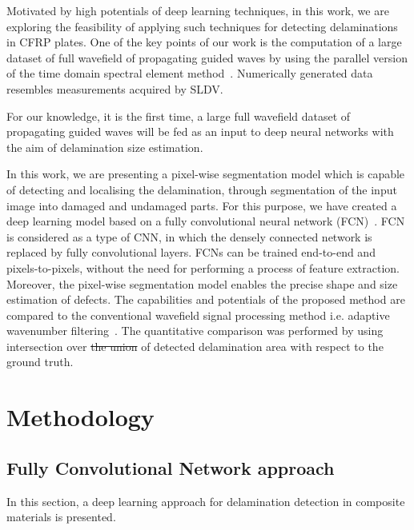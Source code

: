 \documentclass[preprint,9pt]{elsarticle}
\providecommand{\DIFaddtex}[1]{{\protect\color{blue}\uwave{#1}}} %
\providecommand{\DIFdeltex}[1]{{\protect\color{red}\sout{#1}}}                      %
\providecommand{\DIFaddbegin}{} %
\providecommand{\DIFaddend}{} %
\providecommand{\DIFdelbegin}{} %
\providecommand{\DIFdelend}{} %
\providecommand{\DIFadd}[1]{\texorpdfstring{\DIFaddtex{#1}}{#1}} %
\providecommand{\DIFdel}[1]{\texorpdfstring{\DIFdeltex{#1}}{}} %
\newcommand{\DIFscaledelfig}{0.5}
\newlength{\DIFdelgraphicswidth} %
\newlength{\DIFdelgraphicsheight} %
\newcommand{\DIFaddincludegraphics}[2][]{{\color{blue}\fbox{\DIFOincludegraphics[#1]{#2}}}} %
\newcommand{\DIFdelincludegraphics}[2][]{%
\sbox{\DIFdelgraphicsbox}{\DIFOincludegraphics[#1]{#2}}%
\settoboxwidth{\DIFdelgraphicswidth}{\DIFdelgraphicsbox} %
\settoboxtotalheight{\DIFdelgraphicsheight}{\DIFdelgraphicsbox} %
\scalebox{\DIFscaledelfig}{%
\parbox[b]{\DIFdelgraphicswidth}{\usebox{\DIFdelgraphicsbox}\\[-\baselineskip] \rule{\DIFdelgraphicswidth}{0em}}\llap{\resizebox{\DIFdelgraphicswidth}{\DIFdelgraphicsheight}{%
\setlength{\unitlength}{\DIFdelgraphicswidth}%
\begin{picture}(1,1)%
\thicklines\linethickness{2pt} %
{\color[rgb]{1,0,0}\put(0,0){\framebox(1,1){}}}%
{\color[rgb]{1,0,0}\put(0,0){\line( 1,1){1}}}%
{\color[rgb]{1,0,0}\put(0,1){\line(1,-1){1}}}%
\end{picture}%
}\hspace*{3pt}}} %
} %
\DeclareRobustCommand{\DIFaddbegin}{\DIFOaddbegin \let\includegraphics\DIFaddincludegraphics} %
\DeclareRobustCommand{\DIFaddend}{\DIFOaddend \let\includegraphics\DIFOincludegraphics} %
\DeclareRobustCommand{\DIFdelbegin}{\DIFOdelbegin \let\includegraphics\DIFdelincludegraphics} %
\DeclareRobustCommand{\DIFdelend}{\DIFOaddend \let\includegraphics\DIFOincludegraphics} %
\begin{document}
Motivated by high potentials of deep learning techniques, in this work, we are exploring the feasibility of applying such techniques for detecting delaminations in CFRP plates. 
One of the key points of our work is the computation of a large dataset of full wavefield of propagating guided waves by using the parallel version of the time domain spectral element method~\cite{Kudela2020}. 
Numerically generated data resembles measurements acquired by SLDV. 

For our knowledge, it is the first time, a large full wavefield dataset of propagating guided waves will be fed as an input to deep neural networks with the aim of delamination size estimation.

In this work, we are presenting a pixel-wise segmentation model which is capable of detecting and localising the delamination, through segmentation of the input image into damaged and undamaged parts.
For this purpose, we have created a deep learning model based on a fully convolutional neural network (FCN)~\cite{long2015fully}.
FCN is considered as a type of CNN, in which the densely connected network is replaced by fully convolutional layers. 
FCNs can be trained end-to-end and pixels-to-pixels, without the need for performing a process of feature extraction. 
Moreover, the pixel-wise segmentation model enables the precise shape and size estimation of defects.
The capabilities and potentials of the proposed method are compared to the conventional wavefield signal processing method i.e. adaptive wavenumber filtering~\cite{Kudela2015,Radzienski2019}.
The quantitative comparison was performed by using intersection over \DIFdelbegin \DIFdel{the union }\DIFdelend \DIFaddbegin \DIFadd{union (IoU) }\DIFaddend of detected delamination area with respect to the ground truth. 
\section{Methodology}
\DIFdelbegin %
\DIFdelend \DIFaddbegin 


\DIFaddend %
\subsection{Fully Convolutional Network approach}
In this section, a deep learning approach for delamination detection in composite materials is presented. 
\end{document}
